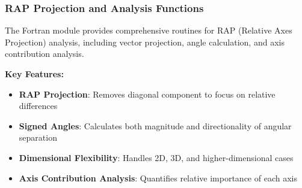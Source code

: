 \subsubsection{RAP Projection and Analysis Functions}
The Fortran module provides comprehensive routines for RAP (Relative Axes Projection) analysis, including vector projection, angle calculation, and axis contribution analysis.

\textbf{Key Features:}
\begin{itemize}
    \item \textbf{RAP Projection}: Removes diagonal component to focus on relative differences
    \item \textbf{Signed Angles}: Calculates both magnitude and directionality of angular separation
    \item \textbf{Dimensional Flexibility}: Handles 2D, 3D, and higher-dimensional cases
    \item \textbf{Axis Contribution Analysis}: Quantifies relative importance of each axis
\end{itemize}

